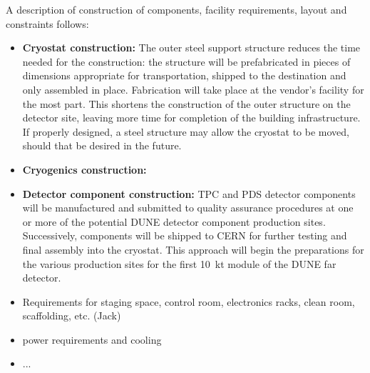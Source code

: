 \label{nuplatform}

A description of construction of components, facility requirements, layout and constraints follows:


\begin{itemize}

\item {\bf Cryostat construction:}
The outer steel support structure reduces the time needed for the construction: the structure will be prefabricated in pieces of dimensions appropriate for transportation, shipped to the destination and only assembled in place. Fabrication will take place at the vendor's facility for the most part. This shortens the construction of the outer structure on the detector site, leaving more time for completion of the building infrastructure. If properly designed, a steel structure may allow the cryostat to be moved, should that be desired in the future.

\item {\bf Cryogenics construction:}

\item {\bf Detector component construction:} 
TPC and PDS detector components will be manufactured and submitted to quality assurance procedures at one or more of the potential DUNE detector component production sites. Successively, components will be shipped to CERN for further testing and final assembly into the cryostat. This approach will begin the preparations for the various production sites for the first 10~kt module of the DUNE far detector.


\item Requirements for staging space, control room, electronics racks, clean room, scaffolding, etc. (Jack)

\item power requirements and cooling 

\item ...

\end{itemize}



